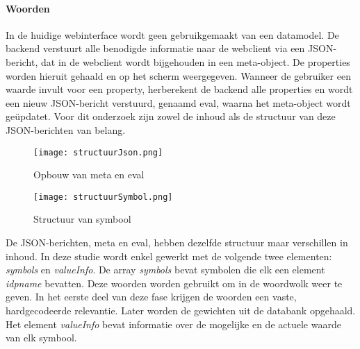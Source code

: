 \paragraph{Woorden}
In de huidige webinterface wordt geen gebruikgemaakt van een datamodel. De backend verstuurt alle benodigde informatie naar de webclient via een JSON-beri\-cht, dat in de webclient wordt bijgehouden in een meta-object. De properties worden hieruit gehaald en op het scherm weergegeven. Wanneer de gebruiker een waarde invult voor een property, herberekent de backend alle properties en wordt een nieuw JSON-bericht verstuurd, genaamd eval, waarna het meta-object wordt geüpdatet. Voor dit onderzoek zijn zowel de inhoud als de structuur van deze JSON-berichten van belang.

\begin{figure}
    \centering
    \begin{minipage}[b]{0.48\textwidth}
        \centering
        \texttt{[image: structuurJson.png]}
        \caption[JSON-bericht]{\label{fig:structuurJson}Opbouw van meta en eval}
    \end{minipage}
    \hfill
    \begin{minipage}[b]{0.48\textwidth}
        \centering
        \texttt{[image: structuurSymbol.png]}
        \caption[Symbool]{\label{fig:structuurSymbol}Structuur van symbool}
    \end{minipage}
\end{figure}

De JSON-berichten, meta en eval, hebben dezelfde structuur maar verschillen in inhoud. In deze studie wordt enkel gewerkt met de volgende twee elementen: \textit{symbols} en \textit{valueInfo}. De array \textit{symbols} bevat symbolen die elk een element \textit{idpname} bevatten. Deze woorden worden gebruikt om in de woordwolk weer te geven. In het eerste deel van deze fase krijgen de woorden een vaste, hardgecodeerde relevantie. Later worden de gewichten uit de databank opgehaald. Het element \textit{valueInfo} bevat informatie over de mogelijke en de actuele waarde van elk symbool.

